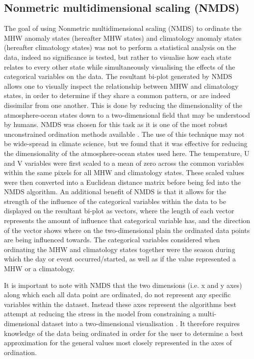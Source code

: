 \documentclass[utf8]{frontiersSCNS}
\begin{document}
\subsection{Nonmetric multidimensional scaling (NMDS)}
The goal of using Nonmetric multidimensional scaling (NMDS) to ordinate the MHW anomaly states (hereafter MHW states) and climatology anomaly states (hereafter climatology states) was not to perform a statistical analysis on the data, indeed no significance is tested, but rather to visualise how each state relates to every other state while simultaneously visualising the effects of the categorical variables on the data. The resultant bi-plot generated by NMDS allows one to visually inspect the relationship between MHW and climatology states, in order to determine if they share a common pattern, or are indeed dissimilar from one another. This is done by reducing the dimensionality of the atmosphere-ocean states down to a two-dimensional field that may be understood by humans. NMDS was chosen for this task as it is one of the most robust unconstrained ordination methods available \citep{Minchin1987}. The use of this technique may not be wide-spread in climate science, but we found that it was effective for reducing the dimensionality of the atmosphere-ocean states used here. The temperature, U and V variables were first scaled to a mean of zero across the common variables within the same pixels for all MHW and climatology states. These scaled values were then converted into a Euclidean distance matrix before being fed into the NMDS algorithm. An additional benefit of NMDS is that it allows for the strength of the influence of the categorical variables within the data to be displayed on the resultant bi-plot as vectors, where the length of each vector represents the amount of influence that categorical variable has, and the direction of the vector shows where on the two-dimensional plain the ordinated data points are being influenced towards. The categorical variables considered when ordinating the MHW and climatology states together were the season during which the day or event occurred/started, as well as if the value represented a MHW or a climatology.

It is important to note with NMDS that the two dimensions (i.e. x and y axes) along which each all data point are ordinated, do not represent any specific variables within the dataset. Instead these axes represent the algorithms best attempt at reducing the stress in the model from  constraining a multi-dimensional dataset into a two-dimensional visualisation \citep{Kruskal1964}. It therefore requires knowledge of the data being ordinated in order for the user to determine a best approximation for the general values most closely represented in the axes of ordination.
\end{document}
